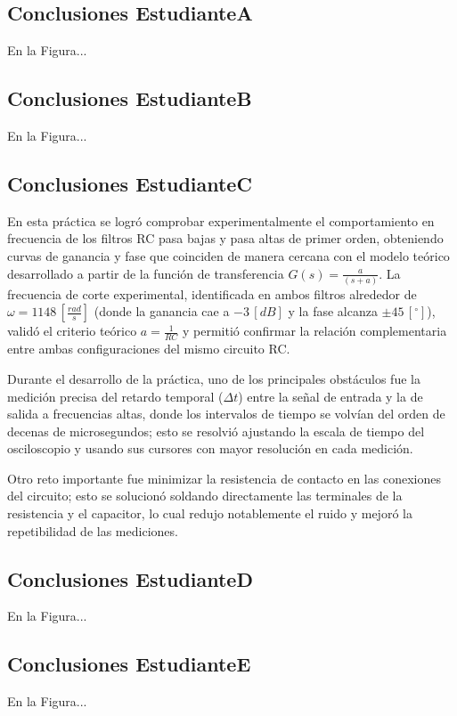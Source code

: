 \documentclass{article}
\begin{document}
\subsection{Conclusiones EstudianteA}
En la Figura...

\subsection{Conclusiones EstudianteB}
En la Figura...

\subsection{Conclusiones EstudianteC}

En esta práctica se logró comprobar experimentalmente el comportamiento en frecuencia de los filtros RC pasa bajas y pasa altas de primer orden, obteniendo curvas de ganancia y fase que coinciden de manera cercana con el modelo teórico desarrollado a partir de la función de transferencia $G(s) = \frac{a}{(s+a)}$. La frecuencia de corte experimental, identificada en ambos filtros alrededor de $\omega = 1148\,[\frac{rad}{s}]$ (donde la ganancia cae a $-3\,[dB]$ y la fase alcanza $\pm 45\,[^\circ]$), validó el criterio teórico $a = \frac{1}{RC}$ y permitió confirmar la relación complementaria entre ambas configuraciones del mismo circuito RC.

Durante el desarrollo de la práctica, uno de los principales obstáculos fue la medición precisa del retardo temporal ($\Delta t$) entre la señal de entrada y la de salida a frecuencias altas, donde los intervalos de tiempo se volvían del orden de decenas de microsegundos; esto se resolvió ajustando la escala de tiempo del osciloscopio y usando sus cursores con mayor resolución en cada medición.

Otro reto importante fue minimizar la resistencia de contacto en las conexiones del circuito; esto se solucionó soldando directamente las terminales de la resistencia y el capacitor, lo cual redujo notablemente el ruido y mejoró la repetibilidad de las mediciones.

\subsection{Conclusiones EstudianteD}
En la Figura...

\subsection{Conclusiones EstudianteE}
En la Figura...
\end{document}
